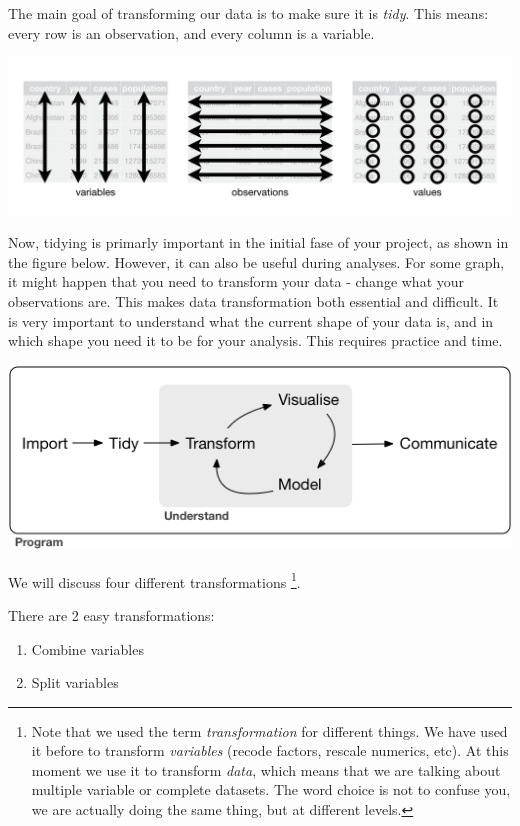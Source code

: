 \documentclass[]{tufte-book}
\providecommand{\tightlist}{%
  \setlength{\itemsep}{0pt}\setlength{\parskip}{0pt}}
\begin{document}
The main goal of transforming our data is to make sure it is \emph{tidy}. This means: every row is an observation, and every column is a variable.

\includegraphics[width=1\linewidth]{images/tidydata}

Now, tidying is primarly important in the initial fase of your project, as shown in the figure below. However, it can also be useful during analyses. For some graph, it might happen that you need to transform your data - change what your observations are. This makes data transformation both essential and difficult. It is very important to understand what the current shape of your data is, and in which shape you need it to be for your analysis. This requires practice and time.

\includegraphics[width=1\linewidth]{images/tidyverse}

We will discuss four different transformations \footnote{Note that we used the term \emph{transformation} for different things. We have used it before to transform \emph{variables} (recode factors, rescale numerics, etc). At this moment we use it to transform \emph{data}, which means that we are talking about multiple variable or complete datasets. The word choice is not to confuse you, we are actually doing the same thing, but at different levels.}.

There are 2 easy transformations:

\begin{enumerate}
\def\labelenumi{\arabic{enumi}.}
\tightlist
\item
  Combine variables
\item
  Split variables
\end{enumerate}
\end{document}

